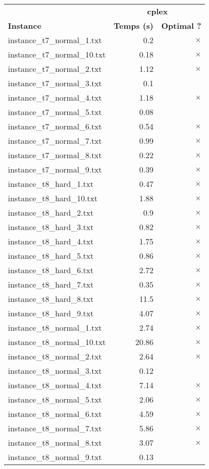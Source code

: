\documentclass{article}
\begin{document}
\newpage
\begin{center}
\renewcommand{\arraystretch}{1.4} 
\begin{tabular}{lrr}
	\hline
 & \multicolumn{2}{c}{\textbf{cplex}}\\
\textbf{Instance}  & \textbf{Temps (s)} & \textbf{Optimal ?} \\\hline

instance\_t7\_normal\_1.txt & 0.2 & 
$\times$
\\
instance\_t7\_normal\_10.txt & 0.18 & 
$\times$
\\
instance\_t7\_normal\_2.txt & 1.12 & 
$\times$
\\
instance\_t7\_normal\_3.txt & 0.1 & 
\\
instance\_t7\_normal\_4.txt & 1.18 & 
$\times$
\\
instance\_t7\_normal\_5.txt & 0.08 & 
\\
instance\_t7\_normal\_6.txt & 0.54 & 
$\times$
\\
instance\_t7\_normal\_7.txt & 0.99 & 
$\times$
\\
instance\_t7\_normal\_8.txt & 0.22 & 
$\times$
\\
instance\_t7\_normal\_9.txt & 0.39 & 
$\times$
\\
instance\_t8\_hard\_1.txt & 0.47 & 
$\times$
\\
instance\_t8\_hard\_10.txt & 1.88 & 
$\times$
\\
instance\_t8\_hard\_2.txt & 0.9 & 
$\times$
\\
instance\_t8\_hard\_3.txt & 0.82 & 
$\times$
\\
instance\_t8\_hard\_4.txt & 1.75 & 
$\times$
\\
instance\_t8\_hard\_5.txt & 0.86 & 
$\times$
\\
instance\_t8\_hard\_6.txt & 2.72 & 
$\times$
\\
instance\_t8\_hard\_7.txt & 0.35 & 
$\times$
\\
instance\_t8\_hard\_8.txt & 11.5 & 
$\times$
\\
instance\_t8\_hard\_9.txt & 4.07 & 
$\times$
\\
instance\_t8\_normal\_1.txt & 2.74 & 
$\times$
\\
instance\_t8\_normal\_10.txt & 20.86 & 
$\times$
\\
instance\_t8\_normal\_2.txt & 2.64 & 
$\times$
\\
instance\_t8\_normal\_3.txt & 0.12 & 
\\
instance\_t8\_normal\_4.txt & 7.14 & 
$\times$
\\
instance\_t8\_normal\_5.txt & 2.06 & 
$\times$
\\
instance\_t8\_normal\_6.txt & 4.59 & 
$\times$
\\
instance\_t8\_normal\_7.txt & 5.86 & 
$\times$
\\
instance\_t8\_normal\_8.txt & 3.07 & 
$\times$
\\
instance\_t8\_normal\_9.txt & 0.13 & 
\\
\hline\end{tabular}
\end{center}
\end{document}
